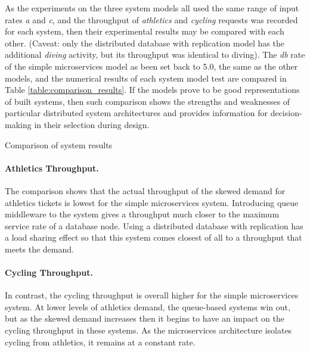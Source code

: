 As the experiments on the three system models all used the same range of input rates {\itshape a} and {\itshape c}, and the throughput of {\itshape athletics} and {\itshape cycling} requests was recorded for each system, then their experimental results may be compared with each other. (Caveat: only the distributed database with replication model has the additional {\itshape diving} activity, but its throughput was identical to diving).  The {\itshape db} rate of the simple microservices model as been set back to 5.0, the same as the other models, and the numerical results of each system model test are compared in Table \ref{table:comparison_results}.  If the models prove to be good representations of built systems, then such comparison shows the strengths and weaknesses of particular distributed system architectures and provides information for decision-making in their selection during design.

\begin{table}[h!]
	\centering
	\caption{Comparison of system results}
	\label{table:comparison_results}
\end{table}

\paragraph{Athletics Throughput.}  The comparison shows that the actual throughput of the skewed demand for athletics tickets is lowest for the simple microservices system.  Introducing queue middleware to the system gives a throughput much closer to the maximum service rate of a database node.  Using a distributed database with replication has a load sharing effect so that this system comes closest of all to a throughput that meets the demand.

\paragraph{Cycling Throughput.}  In contrast, the cycling throughput is overall higher for the simple microservices system.  At lower levels of athletics demand, the queue-based systems win out, but as the skewed demand increases then it begins to have an impact on the cycling throughput in these systems.  As the microservices architecture isolates cycling from athletics, it remains at a constant rate.